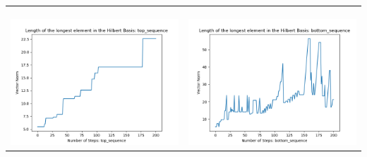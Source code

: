 \documentclass[10pt]{article}
\begin{document}
\begin{tabular}{c|c}
\begin{minipage}{.45\textwidth}
\end{minipage} \\ \\
\hline \\\begin{minipage}{.45\textwidth}
\includegraphics[width=\textwidth]{"DATA/5d/6 generators 2 bound F/top_sequence LENGTH"}
\end{minipage} &
\begin{minipage}{.45\textwidth}
\includegraphics[width=\textwidth]{"DATA/5d/6 generators 2 bound F bottomup/bottom_sequence LENGTH"}
\end{minipage}
\end{tabular}
\end{document}
